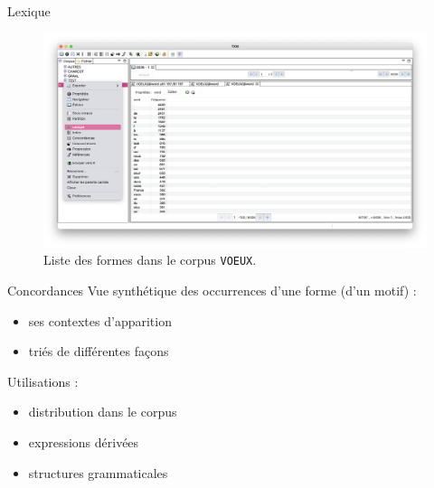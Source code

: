 \documentclass[xetex,xcolor={table,usenames,dvipsnames}]{beamer}
\begin{document}
\begin{frame}{Lexique}
		\begin{figure}[h] %
		\centering
		\includegraphics[width=1\linewidth]{img/lexique.png}
		\caption{Liste des formes dans le corpus \texttt{VOEUX}.}
		\label{fig:ling_out_TAL}
	\end{figure}
\end{frame}
\begin{frame}{Concordances}
	Vue synthétique des occurrences d'une forme (d'un motif) :
	\begin{itemize}
		\item ses contextes d'apparition
		\item triés de différentes façons
	\end{itemize}
	
	Utilisations :
	\begin{itemize}
		\item distribution dans le corpus
		\item expressions dérivées
		\item structures grammaticales
	\end{itemize}
	
	
\end{frame}
\end{document}
